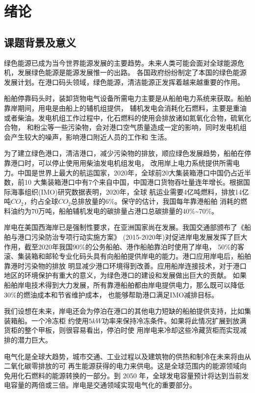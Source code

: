 \chapter{绪论}

\section{课题背景及意义}
绿色能源已成为当今世界能源发展的主要趋势。未来人类可能会面对全球能源危机，发展绿色能源是能源发展惟一的出路。
各国政府纷纷制定了本国的绿色能源发展计划。在港口码头领域，绿色能源，清洁能源正发挥着越来越重要的作用。

船舶停靠码头时，装卸货物电气设备所需电力主要是从船舶电力系统来获取。船舶靠岸期间，用电是由船上的辅机组提供，
辅机发电会消耗化石燃料，主要是重油或者柴油。发电机组工作过程中，化石燃料的使用会排放诸如氮氧化合物，硫氧化合物，
和粉尘等一些污染物，会对港口空气质量造成一定的影响，同时发电机组会产生较大的噪声，影响港口附近人员的工作和
生活。

为了建立绿色港口，清洁港口，减少污染物的排放，顺应绿色发展趋势，船舶在停靠港口时，可以停止使用用柴油发电机组发电，
改用岸上电力系统提供所需电力。中国是世界上最大的航运国家，2020年，全球前20大集装箱港口中国仍占近半数，前10
大集装箱港口中有7个来自中国，中国港口货物吞吐量连年增长。根据国际海事组织(IMO)研究数据表明，2020年，全球
航运业需要4亿吨燃料，排放14亿吨$CO_{2}$，约占全球$CO_{2}$总排放量的$6\%$。保守的估计，我国每年靠港船舶
消耗的燃料油约为$70$万吨，船舶辅机发电的碳排量占港口总碳排量的40\%\~{}70\%\cite{RN8}。

岸电在美国西海岸已是强制性要求，在亚洲国家尚在发展。我国交通部颁布了《船舶与港口污染防治专项行动实施方案》
(2015-2020年)对促进岸电发展发挥了巨大作用，截至2020年我国$90\%$的公务船舶、港作船舶靠泊时使用了岸电，
$50\%$的客滚、集装箱和邮轮专业化码头具有向船舶提供岸电的能力。港口应用岸电后，船舶靠港时污染物的排放
明显减少港口环境得到改善。应用船岸连接技术，对于港口地区的环境保护有重大的意义，为绿色港口的建设和发展做出巨大的贡献。
如果船舶岸电技术得到大力发展，所有靠港船舶都由岸电提供电力，那么既可以降低$30\%$的燃油成本和节省维护成本，
也能够帮助港口满足IMO减排目标。

我们设想在未来，岸电还会为停泊在港口的其他电力短缺的船舶提供支持，比如集装箱船。一个冷冻柜
约使用$5kW$功率来保持冷冻条件。如果将此情况扩展到放满货柜的整个甲板，则很容易看出，停泊时使
用岸电来冷却这些冷藏货柜而实现减排的潜力巨大。

电气化是全球大趋势，城市交通、工业过程以及建筑物的供热和制冷在未来将由从二氧化碳零排放的可
再生能源获得的电力来供电。这是全球范围内的能源领域向免用化石燃料的能源转换的一部分。到 2050
年，全球发电容量预计将达到当前发电容量的两倍或三倍。岸电是交通领域实现电气化的重要部分。

